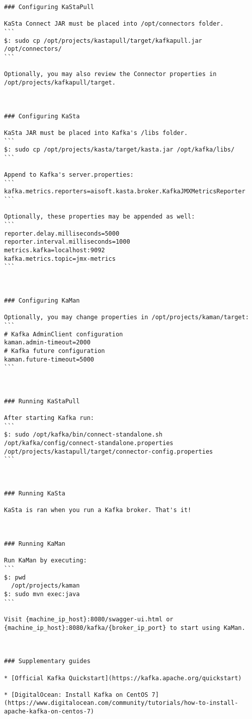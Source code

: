 \documentclass[utf8, diplomski, lmodern, numeric]{fer}
\begin{document}
\begin{lstlisting}[breaklines]
### Configuring KaStaPull

KaSta Connect JAR must be placed into /opt/connectors folder.
```
$: sudo cp /opt/projects/kastapull/target/kafkapull.jar /opt/connectors/
```

Optionally, you may also review the Connector properties in /opt/projects/kafkapull/target.



### Configuring KaSta

KaSta JAR must be placed into Kafka's /libs folder.
```
$: sudo cp /opt/projects/kasta/target/kasta.jar /opt/kafka/libs/
```

Append to Kafka's server.properties:
```
kafka.metrics.reporters=aisoft.kasta.broker.KafkaJMXMetricsReporter
```

Optionally, these properties may be appended as well:
```
reporter.delay.milliseconds=5000
reporter.interval.milliseconds=1000
metrics.kafka=localhost:9092
kafka.metrics.topic=jmx-metrics
```



### Configuring KaMan

Optionally, you may change properties in /opt/projects/kaman/target:
```
# Kafka AdminClient configuration
kaman.admin-timeout=2000
# Kafka future configuration
kaman.future-timeout=5000
```



### Running KaStaPull

After starting Kafka run:  
```
$: sudo /opt/kafka/bin/connect-standalone.sh /opt/kafka/config/connect-standalone.properties /opt/projects/kastapull/target/connector-config.properties
```



### Running KaSta

KaSta is ran when you run a Kafka broker. That's it!  



### Running KaMan

Run KaMan by executing:  
```
$: pwd
  /opt/projects/kaman
$: sudo mvn exec:java
```

Visit {machine_ip_host}:8080/swagger-ui.html or {machine_ip_host}:8080/kafka/{broker_ip_port} to start using KaMan.



### Supplementary guides

* [Official Kafka Quickstart](https://kafka.apache.org/quickstart)

* [DigitalOcean: Install Kafka on CentOS 7](https://www.digitalocean.com/community/tutorials/how-to-install-apache-kafka-on-centos-7)

\end{lstlisting}
\end{document}
